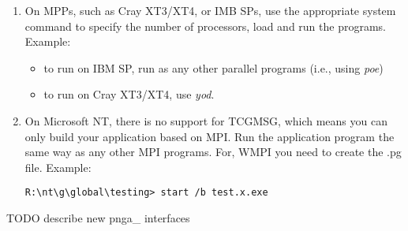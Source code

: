 \begin{enumerate}

\item On MPPs, such as Cray XT3/XT4, or IMB SPs, use the appropriate system
command to specify the number of processors, load and run the programs.
Example: 
\begin{itemize}
\item to run on IBM SP, run as any other parallel programs (i.e., using
\emph{poe}) 
\item to run on Cray XT3/XT4, use \emph{yod}.
\end{itemize}

\item On Microsoft NT, there is no support for TCGMSG, which means you can only
build your application based on MPI. Run the application program the same way
as any other MPI programs. For, WMPI you need to create the .pg file. Example:
\begin{verbatim}
R:\nt\g\global\testing> start /b test.x.exe
\end{verbatim}
\end{enumerate}

TODO describe new pnga\_ interfaces

